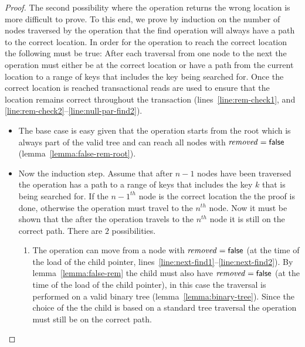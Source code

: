 \begin{proof}
The second possibility where the operation returns the wrong location is more difficult to prove.
To this end, we prove by induction on the number of nodes traversed by the operation that
the find operation will always have a path
to the correct location.
In order for the operation to reach the correct location the following must be true:
After each traversal from one node to the next the operation must either be at the correct location
or have a path from the current location to a range of keys that includes the key being searched for.
Once the correct location is reached transactional reads are used to ensure that the location remains correct throughout the transaction
(lines~\ref{line:rem-check1}, and \ref{line:rem-check2}--\ref{line:null-par-find2}).
\begin{itemize}
\item The base case is easy given that the operation starts from the root which is always part of the valid tree and can reach
all nodes with $\ms{removed}=\lit{false}$ (lemma~\ref{lemma:false-rem-root}).
%
\item Now the induction step.
Assume that after $n-1$ nodes have been traversed the operation has a path to a range of keys that includes the key $k$ that is being searched for.
If the $n-1^{th}$ node is the correct location the the proof is done, otherwise the operation must travel to the $n^{th}$ node.
Now it must be shown that the after the operation travels to the $n^{th}$ node it is still on the correct path.
%
There are $2$ possibilities.
\begin{enumerate}
\item The operation can move from a node with $\ms{removed}=\lit{false}$ (at the time of the load of the child pointer, lines~\ref{line:next-find1}--\ref{line:next-find2}).
By lemma~\ref{lemma:false-rem} the child must also have $\ms{removed}=\lit{false}$ (at the time of the load of the child pointer),
in this case the traversal is performed on a valid binary tree (lemma~\ref{lemma:binary-tree}).
Since the choice of the the child is based on a standard tree traversal the operation must still be on the correct path.


\end{enumerate}
\end{itemize}
\end{proof}
